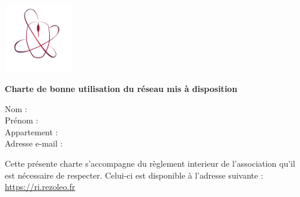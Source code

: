 \documentclass[12pt]{article}
\begin{document}
	
\thispagestyle{empty}

\begin{minipage}{0.15\linewidth}
	\includegraphics[height=3cm]{rezoleo.png}
\end{minipage}\hfill
\begin{minipage}{0.80\linewidth}
\LARGE \textbf{Charte de bonne utilisation du réseau mis à disposition}
\end{minipage}

\begin{flushright}
	\begin{minipage}{0.5\linewidth}
		Nom : \dotfill\\
		Prénom : \dotfill\\
		Appartement : \dotfill\\
		Adresse e-mail : \dotfill
	\end{minipage}
\end{flushright}
\vspace*{0.5cm}

Cette présente charte s'accompagne du règlement interieur de l'association qu'il est nécessaire de respecter. Celui-ci est disponible à l'adresse suivante : \url{https://ri.rezoleo.fr}

\vspace*{0.5cm}
\end{document}
